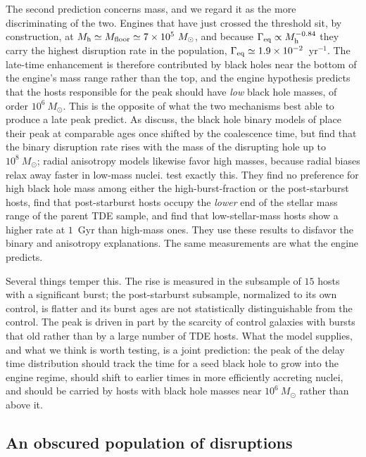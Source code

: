 \documentclass[preprint2]{aastex}
\newcommand{\msun}{M_{\odot}\xspace}
\begin{document}
The second prediction concerns mass, and we regard it as the more discriminating of the two. Engines that have just crossed the threshold sit, by construction, at $M_{\rm h} \simeq M_{\rm floor} \simeq 7 \times 10^{5}~\msun$, and because $\Gamma_{\rm eq} \propto M_{\rm h}^{-0.84}$ they carry the highest disruption rate in the population, $\Gamma_{\rm eq} \simeq 1.9 \times 10^{-2}$~yr$^{-1}$. The late-time enhancement is therefore contributed by black holes near the bottom of the engine's mass range rather than the top, and the engine hypothesis predicts that the hosts responsible for the peak should have {\it low} black hole masses, of order $10^{6}~\msun$. This is the opposite of what the two mechanisms best able to produce a late peak predict. As \citet{Shepherd:2026a} discuss, the black hole binary models of \citet{Melchor:2024a} place their peak at comparable ages once shifted by the coalescence time, but \citet{Melchor:2025a} find that the binary disruption rate rises with the mass of the disrupting hole up to $10^{8}~\msun$; radial anisotropy models likewise favor high masses, because radial biases relax away faster in low-mass nuclei. \citet{Shepherd:2026a} test exactly this. They find no preference for high black hole mass among either the high-burst-fraction or the post-starburst hosts, find that post-starburst hosts occupy the {\it lower} end of the stellar mass range of the parent TDE sample, and find that low-stellar-mass hosts show a higher rate at $1$~Gyr than high-mass ones. They use these results to disfavor the binary and anisotropy explanations. The same measurements are what the engine predicts.

Several things temper this. The rise is measured in the subsample of $15$ hosts with a significant burst; the post-starburst subsample, normalized to its own control, is flatter and its burst ages are not statistically distinguishable from the control. The peak is driven in part by the scarcity of control galaxies with bursts that old rather than by a large number of TDE hosts. What the model supplies, and what we think is worth testing, is a joint prediction: the peak of the delay time distribution should track the time for a seed black hole to grow into the engine regime, should shift to earlier times in more efficiently accreting nuclei, and should be carried by hosts with black hole masses near $10^{6}~\msun$ rather than above it.

\subsection{An obscured population of disruptions}\label{subsec:obscured}
\end{document}

